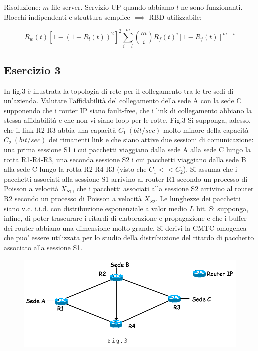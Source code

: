 Risoluzione: $m$ file server. Servizio UP quando abbiamo $l$ ne sono funzionanti. Blocchi indipendenti e struttura semplice $\implies$ RBD utilizzabile:

\[
	R_w(t)[1-(1-R_l(t))^2]^2\sum_{i=l}^m{\binom{m}{i}R_f(t)^i[1-R_f(t)]^{m-i}}
\]


\subsection{Esercizio 3}

In fig.3 è illustrata la topologia di rete per il collegamento tra le tre sedi di un’azienda. Valutare l’affidabilità del collegamento della sede A con la sede C supponendo che i router IP siano fault-free, che i link di collegamento abbiano la stessa affidabilità e che non vi siano loop per le rotte.           
Fig.3  
Si supponga, adesso, che il link R2-R3 abbia una capacità $C_1\ (bit/sec)$ molto minore della capacità $C_2\ (bit/sec)$ dei rimanenti link e che siano attive due sessioni di comunicazione: una prima sessione S1 i cui pacchetti viaggiano dalla sede A alla sede C lungo la rotta R1-R4-R3, una seconda sessione S2 i cui pacchetti viaggiano dalla sede B alla sede C lungo la rotta R2-R4-R3 (visto che $C_1<<C_2$). Si assuma che i pacchetti associati alla sessione S1 arrivino al router R1 secondo un processo di Poisson a velocità $X_{S1}$, che i pacchetti associati alla sessione S2 arrivino al router R2 secondo un processo di Poisson a velocità $X_{S2}$. Le lunghezze dei pacchetti siano v.c. i.i.d. con distribuzione esponenziale a valor medio $L$ bit. Si supponga, infine, di poter trascurare i ritardi di elaborazione e propagazione e che i buffer dei router abbiano una dimensione molto grande. Si derivi la CMTC omogenea che puo’ essere utilizzata per lo studio della distribuzione del ritardo di pacchetto associato alla sessione S1.

\begin{center}
\begin{figure}[H]
\centering
\includegraphics[scale=1]{figures/ex/hw13.png}
\end{figure}
\end{center}

